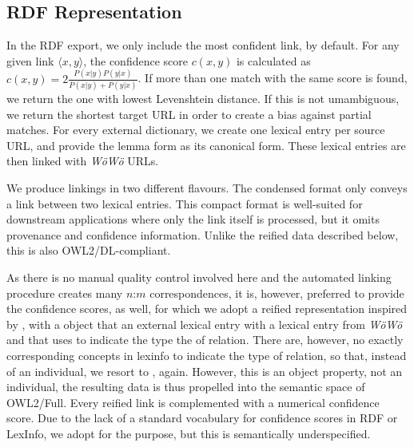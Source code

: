 \subsection{RDF Representation}

In the RDF export, we only include the most confident link, by default. For any given link $\langle x,y\rangle$, the confidence score $c(x,y)$ is calculated as $c(x,y)=2 \frac{P(x|y) P(y|x)}{P(x|y) + P(y|x)}$. If more than one match with the same score is found, we return the one with lowest Levenshtein distance. If this is not umambiguous, we return the shortest target URL in order to create a bias against partial matches. For every external dictionary, we create one lexical entry per source URL, and provide the lemma form as its canonical form. These lexical entries are then linked with \emph{WöWö} URLs.

We produce linkings in two different flavours. The condensed format only conveys a  link between two lexical entries. %
This compact format is well-suited for downstream applications where only the link itself is processed, but it omits provenance and confidence information. Unlike the reified data described below, this is also OWL2/DL-compliant. 

As there is no manual quality control involved here and the automated linking procedure creates many $n$:$m$ correspondences, it is, however, preferred to provide the confidence scores, as well, for which we adopt a reified representation inspired by \citet{gillis2023refinement}, with a  object that  an external lexical entry with a lexical entry from \emph{WöWö} and that uses  to indicate the type the of relation. There are, however, no exactly corresponding concepts in lexinfo to indicate the type of relation, so that, instead of an individual, we resort to , again. However, this is an object property, not an individual, the resulting data is thus propelled into the semantic space of OWL2/Full.
Every reified link is complemented with a numerical confidence score. Due to the lack of a standard vocabulary for confidence scores in RDF or LexInfo, we adopt  for the purpose, but this is semantically underspecified. %

